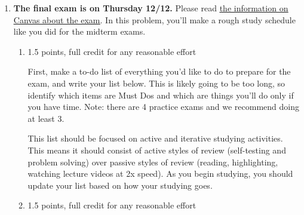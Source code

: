 \documentclass{article}
\makeatletter
\let\@href=\href
\renewcommand{\href}[2]{\@href{#1}{\ul{#2}}}
\makeatother
\begin{document}
\begin{enumerate}
\begin{solution}
    \textbf{Find maximum:}
    The area is a quadratic function in $x$. The coefficient of $x^2$
    would be negative if we expanded, the graph would be a concave down
    parabola. So there is a global maximum, at the vertex. The vertex is located half-way between the $x$-intercepts, 
    $0$ and $200$, so at $x=100$.

    \textbf{Answer the question:} When $x=100$, 
    $y=300-\frac{3}{2}(100)=150$. To maximize the area,
    Troy should make a pen with a width of $100$ feet and
    a length of $150$ feet.
  \end{solution}

\newpage
\item 
{\bf The final exam is on Thursday 12/12.} Please read  \href{https://canvas.harvard.edu/courses/138327/pages/exams}{the information on Canvas about the exam}. In this problem, you'll make a rough study schedule like you did for the midterm exams.\\

 \begin{enumerate}
  \item

    \begin{grading}
      1.5 points, full credit for any reasonable effort
    \end{grading}

    \begin{problem}[\vfill\newpage]
      First, make a to-do list of everything you’d like to do to prepare for the exam, and write your list below. This is likely going to be too long, so identify which items are Must Dos and which are things you'll do only if you have time. Note: there are 4 practice exams and we recommend doing at least 3.

      This list should be focused on active and iterative studying activities. This means it should consist of active styles of review (self-testing and problem solving) over passive styles of review (reading, highlighting, watching lecture videos at 2x speed). As you begin studying, you should update your list based on how your studying goes. 
    \end{problem}

  \item

    \begin{grading}
      1.5 points, full credit for any reasonable effort
    \end{grading}


\end{enumerate}
\end{enumerate}
\end{document}
